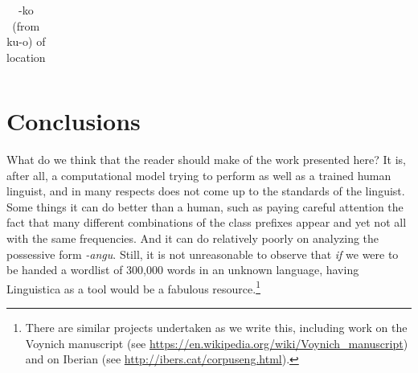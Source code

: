 \documentclass[output=paper,colorlinks,citecolor=brown]{langscibook}
\begin{document}
\begin{table}
\begin{center}
\begin{tabular}{lllllllllllllllllll}
 
 
\\
 \end{tabular}
\caption{-ko (from ku-o) of location}
\label{ko}
\end{center}
\end{table}




\section{Conclusions}

What do we think that the reader should make of the work presented here? It is, after all, a computational model trying to perform as well as a trained human linguist, and in many respects does not come up to the standards of the linguist. Some things it can do better than a human, such as paying careful attention the fact that many different combinations of the class prefixes appear and yet not all with the same frequencies. And it can do relatively poorly on analyzing the possessive form \textit{-angu}. Still, it is not unreasonable to observe that \textit{if} we were to be handed a wordlist of 300,000 words in an unknown language, having Linguistica as a tool would be a fabulous resource.\footnote{There are similar projects undertaken as we write this, including work on the Voynich manuscript (see \url{https://en.wikipedia.org/wiki/Voynich\_manuscript}) and on Iberian (see \url{http://ibers.cat/corpuseng.html}).} 
\end{document}
